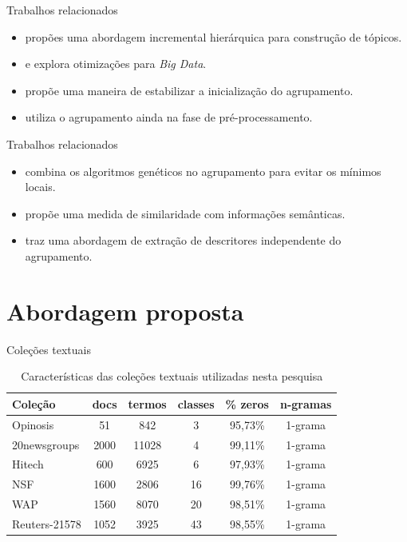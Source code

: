 \documentclass[brazil]{beamer}
\begin{document}
\begin{frame}{Trabalhos relacionados}
  \begin{itemize}
  \item<1 ->  propões uma abordagem incremental hierárquica para construção
    de tópicos.
  \item<2 ->  e  explora otimizações para {\it Big
    Data\/}.
  \item<3 ->  propõe uma maneira de estabilizar a inicialização do agrupamento.
  \item<4 ->  utiliza o agrupamento ainda na fase de pré-processamento.
  \end{itemize}
\end{frame}
\begin{frame}{Trabalhos relacionados}
  \begin{itemize}
  \item<1 ->  combina os algoritmos genéticos no agrupamento para evitar os
    mínimos locais.
  \item<2 ->  propõe uma medida de similaridade com informações semânticas. 
  \item<3 ->  traz uma abordagem de extração de descritores independente do
    agrupamento.
  \end{itemize}
\end{frame}

\section{Abordagem proposta}

\begin{frame}{Coleções textuais}
  \begin{table}[!htp]
    \centering
    \begin{tabular}{ |l|c c c c c|}
      \hline
      {\bf Coleção} & {\bf docs} & {\bf termos} & {\bf classes} & {\bf \alert{\% zeros}} & {\bf
    n-gramas} \\
      \hline
      Opinosis & 51 & 842 & 3         & \alert{95,73\%} & 1-grama \\
      \hline
      20newsgroups & 2000 & 11028 & 4 & \alert{99,11\%} & 1-grama \\
      \hline
      Hitech & 600 & 6925 & 6         & \alert{97,93\%} & 1-grama \\
      \hline
      NSF & 1600 & 2806 & 16          & \alert{99,76\%} & 1-grama \\
      \hline
      WAP & 1560 & 8070 & 20          & \alert{98,51\%} & 1-grama \\
      \hline
      Reuters-21578 & 1052 & 3925 & 43 & \alert{98,55\%} & 1-grama \\
      \hline
    \end{tabular}
    \caption{Características das coleções textuais utilizadas nesta pesquisa}
    \label{table:datasets}
  \end{table}
\end{frame}
\end{document}
